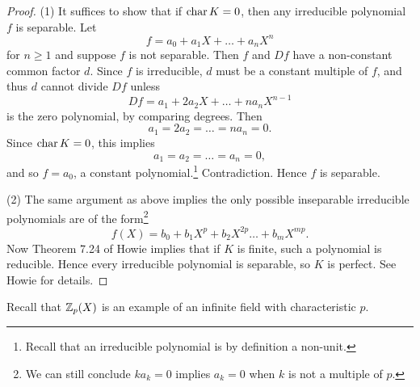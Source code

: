 \begin{proof}
  (1) It suffices to show that if $\operatorname{char} K = 0$, then
  any irreducible polynomial $f$ is separable. Let
  \[
    f = a_0 + a_1 X + \dots + a_n X^n
  \]
  for $n \ge 1$ and suppose $f$ is not separable. Then
  $f$ and $Df$ have a non-constant common factor $d$.
  Since $f$ is irreducible, $d$ must be a constant
  multiple of $f$, and thus $d$ cannot divide $Df$
  unless
  \[
    Df = a_1 + 2a_2 X + \dots + na_n X^{n-1}
  \]
  is the zero polynomial, by comparing degrees. Then
  \[
    a_1 = 2a_2 = \dots = na_n = 0.
  \]
  Since $\operatorname{char} K = 0$, this implies
  \[a_1 = a_2 = \dots = a_n = 0,\]
  and so $f = a_0$,
  a constant polynomial.\footnote{Recall that an irreducible polynomial is by definition a non-unit.}
  Contradiction. Hence $f$ is separable.

  (2) The same argument as above implies the only possible
  inseparable irreducible polynomials are of the form\footnote{We can still conclude $ka_k = 0$ implies $a_k = 0$ when $k$ is not a multiple of $p$.}
  \[
    f(X) = b_0 + b_1 X^p + b_2 X^{2p} \dots + b_{m} X^{mp}.
  \]
  Now Theorem 7.24 of Howie implies that if $K$ is finite,
  such a polynomial is reducible. Hence every irreducible
  polynomial is separable, so $K$ is perfect. See Howie
  for details.
\end{proof}

\begin{remark}
  Recall that $\mathbb{Z}_p(X)$ is an example of an infinite
  field with characteristic $p$.
\end{remark}
